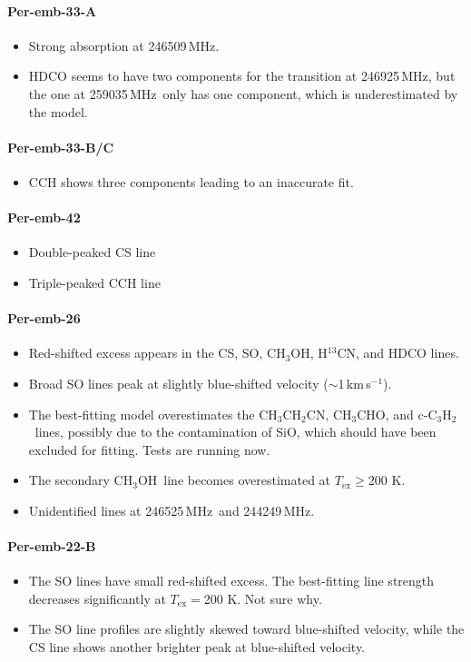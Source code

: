 \documentclass[twocolumn]{aastex62}
\newcommand{\kms}{\mbox{\,km\,s$^{-1}$}}
\newcommand{\mhz}{\mbox{\,MHz}}
\newcommand{\htcn}{\mbox{H$^{13}$CN}}
\newcommand{\methanol}{\mbox{CH$_{3}$OH}}
\newcommand{\acetaldehyde}{\mbox{CH$_{3}$CHO}}
\newcommand{\ethylcyanide}{\mbox{CH$_{3}$CH$_{2}$CN}}
\newcommand{\cctht}{\mbox{c-C$_{3}$H$_{2}$}}
\begin{document}
\paragraph{Per-emb-33-A}
\begin{itemize}
  \item Strong absorption at 246509\mhz.
  \item HDCO seems to have two components for the transition at 246925\mhz, but the one at 259035\mhz\ only has one component, which is underestimated by the model.
\end{itemize}

\paragraph{Per-emb-33-B/C}
\begin{itemize}
  \item CCH shows three components leading to an inaccurate fit.
\end{itemize}

\paragraph{Per-emb-42}
\begin{itemize}
  \item Double-peaked CS line
  \item Triple-peaked CCH line
\end{itemize}

\paragraph{Per-emb-26}
\begin{itemize}
  \item Red-shifted excess appears in the CS, SO, \methanol, \htcn, and HDCO lines.
  \item Broad SO lines peak at slightly blue-shifted velocity ($\sim$1\kms).
  \item The best-fitting model overestimates the \ethylcyanide, \acetaldehyde, and \cctht\ lines, possibly due to the contamination of SiO, which should have been excluded for fitting.  Tests are running now.
  \item The secondary \methanol\ line becomes overestimated at $T_\text{ex} \geq $200 K.
  \item Unidentified lines at 246525\mhz\ and 244249\mhz.
\end{itemize}

\paragraph{Per-emb-22-B}
\begin{itemize}
  \item The SO lines have small red-shifted excess.  The best-fitting line strength decreases significantly at $T_\text{ex} = $200 K.  Not sure why.
  \item The SO line profiles are slightly skewed toward blue-shifted velocity, while the CS line shows another brighter peak at blue-shifted velocity.
\end{itemize}
\end{document}
